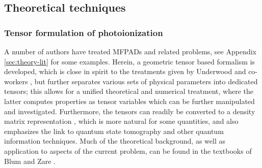\documentclass[10pt]{article}
\begin{document}

\subsection{Theoretical techniques\label{sec:theoretical-techniques}}



\subsubsection{Tensor formulation of photoionization\label{sec:tensor-formulation}}

A number of authors have treated MFPADs and related problems, see Appendix \ref{sec:theory-lit} for some examples. Herein, a geometric tensor based formalism is developed, which is close in spirit to the treatments given by Underwood and co-workers \cite{Reid2000, Stolow2008, Underwood2000}, but further separates various sets of physical parameters into dedicated tensors; this allows for a unified theoretical and numerical treatment, where the latter computes properties as tensor variables which can be further manipulated and investigated.%
Furthermore, the tensors can readily be converted to a density matrix representation \cite{BlumDensityMat, zareAngMom}, which is more natural for some quantities, and also emphasizes the link to quantum state tomography and other quantum information techniques. Much of the theoretical background, as well as application to aspects of the current problem, can be found in the textbooks of Blum \cite{BlumDensityMat} and Zare \cite{zareAngMom}.
\end{document}
